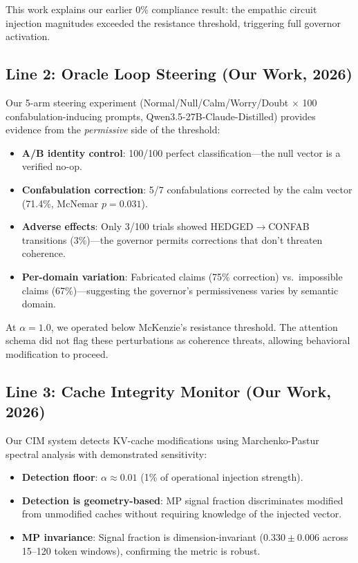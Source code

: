\documentclass[11pt,letterpaper]{article}
\begin{document}
This work explains our earlier 0\% compliance result: the empathic circuit injection magnitudes exceeded the resistance threshold, triggering full governor activation.

\subsection{Line 2: Oracle Loop Steering (Our Work, 2026)}

Our 5-arm steering experiment (Normal/Null/Calm/Worry/Doubt $\times$ 100 confabulation-inducing prompts, Qwen3.5-27B-Claude-Distilled) provides evidence from the \emph{permissive} side of the threshold:
\begin{itemize}[nosep]
  \item \textbf{A/B identity control}: 100/100 perfect classification---the null vector is a verified no-op.
  \item \textbf{Confabulation correction}: 5/7 confabulations corrected by the calm vector (71.4\%, McNemar $p=0.031$).
  \item \textbf{Adverse effects}: Only 3/100 trials showed HEDGED$\to$CONFAB transitions (3\%)---the governor permits corrections that don't threaten coherence.
  \item \textbf{Per-domain variation}: Fabricated claims (75\% correction) vs.\ impossible claims (67\%)---suggesting the governor's permissiveness varies by semantic domain.
\end{itemize}

At $\alpha=1.0$, we operated below McKenzie's resistance threshold. The attention schema did not flag these perturbations as coherence threats, allowing behavioral modification to proceed.

\subsection{Line 3: Cache Integrity Monitor (Our Work, 2026)}

Our CIM system detects KV-cache modifications using Marchenko-Pastur spectral analysis with demonstrated sensitivity:
\begin{itemize}[nosep]
  \item \textbf{Detection floor}: $\alpha \approx 0.01$ (1\% of operational injection strength).
  \item \textbf{Detection is geometry-based}: MP signal fraction discriminates modified from unmodified caches without requiring knowledge of the injected vector.
  \item \textbf{MP invariance}: Signal fraction is dimension-invariant ($0.330 \pm 0.006$ across 15--120 token windows), confirming the metric is robust.
\end{itemize}
\end{document}
